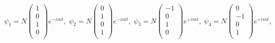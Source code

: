 \documentclass[11pt]{article}
\theoremstyle{definition}
\begin{document}
\begin{equation}
\boxed{
    \psi_1 =  N\begin{pmatrix}
        1\\
        0\\
        1\\
        0\\
    \end{pmatrix}e^{-imt},\;
    \psi_2 = N\begin{pmatrix}
        0\\
        1\\
        0\\
        1\\
    \end{pmatrix}e^{-imt},\;
    \psi_3 = N\begin{pmatrix}
        -1\\
        0\\
        1\\
        0\\
    \end{pmatrix}e^{+imt},\;
    \psi_4 = N\begin{pmatrix}
        0\\
        -1\\
        0\\
        1\\
    \end{pmatrix}e^{+imt},\;
}
\end{equation}
\newpage
\end{document}
